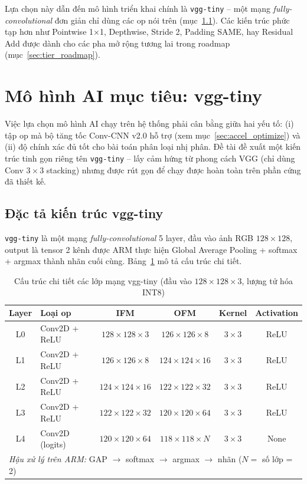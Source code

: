 Lựa chọn này dẫn đến mô hình triển khai chính là \texttt{vgg-tiny} -- một mạng \textit{fully-convolutional} đơn giản chỉ dùng các op nói trên (mục~\ref{sec:vgg_tiny}). Các kiến trúc phức tạp hơn như Pointwise 1$\times$1, Depthwise, Stride 2, Padding SAME, hay Residual Add được dành cho các pha mở rộng tương lai trong roadmap (mục~\ref{sec:tier_roadmap}).

%
\newpage
\section{Mô hình AI mục tiêu: vgg-tiny}
\label{sec:ai_algorithm}

Việc lựa chọn mô hình AI chạy trên hệ thống phải cân bằng giữa hai yếu tố: (i) tập op mà bộ tăng tốc Conv-CNN v2.0 hỗ trợ (xem mục~\ref{sec:accel_optimize}) và (ii) độ chính xác đủ tốt cho bài toán phân loại nhị phân. Đề tài đề xuất một kiến trúc tinh gọn riêng tên \texttt{vgg-tiny} -- lấy cảm hứng từ phong cách VGG (chỉ dùng Conv $3 \times 3$ stacking) nhưng được rút gọn để chạy được hoàn toàn trên phần cứng đã thiết kế.

\subsection{Đặc tả kiến trúc vgg-tiny}
\label{sec:vgg_tiny}
\texttt{vgg-tiny} là một mạng \textit{fully-convolutional} 5 layer, đầu vào ảnh RGB $128 \times 128$, output là tensor 2 kênh được ARM thực hiện Global Average Pooling + softmax + argmax thành nhãn cuối cùng. Bảng~\ref{tab:vgg_tiny_layers} mô tả cấu trúc chi tiết.

\begin{table}[h]
\centering
\caption{Cấu trúc chi tiết các lớp mạng vgg-tiny (đầu vào $128 \times 128 \times 3$, lượng tử hóa INT8)}
\label{tab:vgg_tiny_layers}
\begin{tabular}{|c|l|c|c|c|c|}
\hline
\textbf{Layer} & \textbf{Loại op} & \textbf{IFM} & \textbf{OFM} & \textbf{Kernel} & \textbf{Activation} \\ \hline
L0 & Conv2D + ReLU & $128 \times 128 \times 3$ & $126 \times 126 \times 8$ & $3 \times 3$ & ReLU \\ \hline
L1 & Conv2D + ReLU & $126 \times 126 \times 8$ & $124 \times 124 \times 16$ & $3 \times 3$ & ReLU \\ \hline
L2 & Conv2D + ReLU & $124 \times 124 \times 16$ & $122 \times 122 \times 32$ & $3 \times 3$ & ReLU \\ \hline
L3 & Conv2D + ReLU & $122 \times 122 \times 32$ & $120 \times 120 \times 64$ & $3 \times 3$ & ReLU \\ \hline
L4 & Conv2D (logits) & $120 \times 120 \times 64$ & $118 \times 118 \times N$ & $3 \times 3$ & None \\ \hline
\multicolumn{6}{|l|}{\textit{Hậu xử lý trên ARM:} GAP $\to$ softmax $\to$ argmax $\to$ nhãn ($N = $ số lớp = 2)} \\ \hline
\end{tabular}
\end{table}

